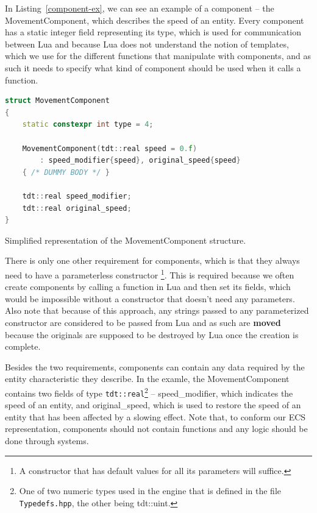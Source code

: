 In Listing~\ref{component-ex}, we can see an example of a component -- the MovementComponent, which describes the speed of an entity.
Every component has a static integer field representing its type, which is used for communication between Lua and \cpp because Lua does not
understand the notion of templates, which we use for the different functions that manipulate with components, and as such it needs
to specify what kind of component should be used when it calls a \cpp function.

\begin{listing}[H]
    \centering
    \begin{lstlisting}[language=C++]
struct MovementComponent
{
    static constexpr int type = 4;

    MovementComponent(tdt::real speed = 0.f)
        : speed_modifier{speed}, original_speed{speed}
    { /* DUMMY BODY */ }

    tdt::real speed_modifier;
    tdt::real original_speed;
}
    \end{lstlisting}
    \caption{Simplified representation of the MovementComponent structure.}
    \label{component-ex}
\end{listing}

There is only one other requirement for components, which is that they always need to have a parameterless constructor
\footnote{A constructor that has default values for all its parameters will suffice.}. This is required because
we often create components by calling a \cpp function in Lua and then set its fields, which would be impossible without a constructor that
doesn't need any parameters. Also note that because of this approach, any strings passed to any parameterized constructor are considered
to be passed from Lua and as such are \textbf{moved} because the originals are supposed to be destroyed by Lua once the creation is complete.

Besides the two requirements, components can contain any data required by the entity characteristic they describe. In the examle, the
MovementComponent contains two fields of type \texttt{tdt::real}\footnote{One of two numeric types used in the engine that is defined
in the file \texttt{Typedefs.hpp}, the other being tdt::uint.}
-- speed\_modifier, which indicates the speed of an entity, and original\_speed, which is used
to restore the speed of an entity that has been affected by a slowing effect. Note that, to conform our
ECS representation, components should not contain functions and any logic should be done through systems.

